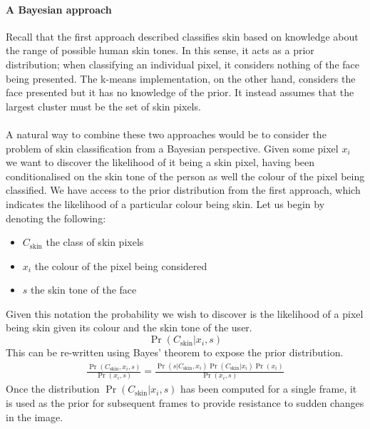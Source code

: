 \paragraph{A Bayesian approach}
Recall that the first approach described classifies skin based on knowledge about the range of possible human skin tones. 
In this sense, it acts as a prior distribution; when classifying an individual pixel, it considers nothing of the face being presented.
The k-means implementation, on the other hand, considers the face presented but it has no knowledge of the prior. It instead assumes that the largest cluster must be the set of skin pixels.
\\ \\ 
A natural way to combine these two approaches would be to consider the problem of skin classification from a Bayesian perspective. Given some pixel $x_i$ we want to discover the likelihood of it being a skin pixel, having been conditionalised on the skin tone of the person as well the colour of the pixel being classified. 
We have access to the prior distribution from the first approach, which indicates the likelihood of a particular colour being skin.
Let us begin by denoting the following: 
\begin{itemize}
   \item $C_{\mathrm{skin}}$ the class of skin pixels
   \item $x_i$ the colour of the pixel being considered
   \item $s$ the skin tone of the face
\end{itemize} 
Given this notation the probability we wish to discover is the likelihood of a pixel being skin given its colour and the skin tone of the user.
\begin{equation*}
   \Pr(C_{\mathrm{skin}}| x_i, s) 
\end{equation*}
This can be re-written using Bayes' theorem to expose the prior distribution.
\begin{align*}
   \frac{\Pr(C_\mathrm{skin}, x_i, s)}{\Pr(x_i, s)} = \frac{\Pr(s|C_\mathrm{skin}, x_i)\Pr(C_\mathrm{skin}|x_i)\Pr(x_i)}{\Pr(x_i,s)}
\end{align*}
Once the distribution $\Pr(C_\mathrm{skin}|x_i,s)$ has been computed for a single frame, it is used as the prior for subsequent frames to provide resistance to 
sudden changes in the image.
